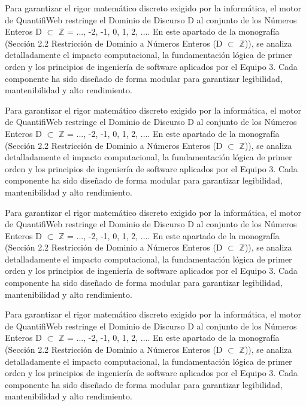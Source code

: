 \documentclass[11pt,a4paper]{article}
\begin{document}
Para garantizar el rigor matemático discreto exigido por la informática,
el motor de QuantifiWeb restringe el Dominio de Discurso D al conjunto
de los Números Enteros D $ \subset $ $\mathbb{Z}$ = {..., -2, -1, 0, 1, 2, ...}. En este
apartado de la monografía (Sección 2.2 Restricción de Dominio a Números
Enteros (D $ \subset $ $\mathbb{Z}$)), se analiza detalladamente el impacto computacional, la
fundamentación lógica de primer orden y los principios de ingeniería de
software aplicados por el Equipo 3. Cada componente ha sido diseñado de
forma modular para garantizar legibilidad, mantenibilidad y alto
rendimiento.

Para garantizar el rigor matemático discreto exigido por la informática,
el motor de QuantifiWeb restringe el Dominio de Discurso D al conjunto
de los Números Enteros D $ \subset $ $\mathbb{Z}$ = {..., -2, -1, 0, 1, 2, ...}. En este
apartado de la monografía (Sección 2.2 Restricción de Dominio a Números
Enteros (D $ \subset $ $\mathbb{Z}$)), se analiza detalladamente el impacto computacional, la
fundamentación lógica de primer orden y los principios de ingeniería de
software aplicados por el Equipo 3. Cada componente ha sido diseñado de
forma modular para garantizar legibilidad, mantenibilidad y alto
rendimiento.

Para garantizar el rigor matemático discreto exigido por la informática,
el motor de QuantifiWeb restringe el Dominio de Discurso D al conjunto
de los Números Enteros D $ \subset $ $\mathbb{Z}$ = {..., -2, -1, 0, 1, 2, ...}. En este
apartado de la monografía (Sección 2.2 Restricción de Dominio a Números
Enteros (D $ \subset $ $\mathbb{Z}$)), se analiza detalladamente el impacto computacional, la
fundamentación lógica de primer orden y los principios de ingeniería de
software aplicados por el Equipo 3. Cada componente ha sido diseñado de
forma modular para garantizar legibilidad, mantenibilidad y alto
rendimiento.

Para garantizar el rigor matemático discreto exigido por la informática,
el motor de QuantifiWeb restringe el Dominio de Discurso D al conjunto
de los Números Enteros D $ \subset $ $\mathbb{Z}$ = {..., -2, -1, 0, 1, 2, ...}. En este
apartado de la monografía (Sección 2.2 Restricción de Dominio a Números
Enteros (D $ \subset $ $\mathbb{Z}$)), se analiza detalladamente el impacto computacional, la
fundamentación lógica de primer orden y los principios de ingeniería de
software aplicados por el Equipo 3. Cada componente ha sido diseñado de
forma modular para garantizar legibilidad, mantenibilidad y alto
rendimiento.
\end{document}
